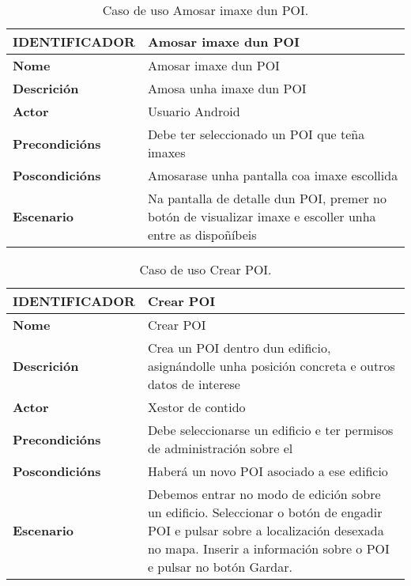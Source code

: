 \begin{table}[tbh]
	\footnotesize
	\centering
	\begin{tabular}{|l|p{10cm}|}
		\hline 
		\textbf{IDENTIFICADOR}	& \textbf{Amosar imaxe dun POI} \\ 
		\hline 
		\textbf{Nome} & Amosar imaxe dun POI \\ 
		\hline 
		\textbf{Descrición} & Amosa unha imaxe dun POI \\ 
		\hline 
		\textbf{Actor} & Usuario Android \\ 
		\hline 
		\textbf{Precondicións} & Debe ter seleccionado un POI que teña imaxes \\ 
		\hline 
		\textbf{Poscondicións} & Amosarase unha pantalla coa imaxe escollida \\ 
		\hline 
		\textbf{Escenario} & Na pantalla de detalle dun POI, premer no botón de visualizar imaxe e escoller unha entre as dispoñíbeis \\ 
		\hline 
	\end{tabular}
	\caption{Caso de uso Amosar imaxe dun POI.}
	\label{tab:cuAmosarImaxePOI}
\end{table}

\begin{table}[tbh]
	\footnotesize
	\centering
	\begin{tabular}{|l|p{10cm}|}
		\hline 
		\textbf{IDENTIFICADOR}	& \textbf{Crear POI} \\ 
		\hline 
		\textbf{Nome} & Crear POI \\ 
		\hline 
		\textbf{Descrición} & Crea un POI dentro dun edificio, asignándolle unha posición concreta e outros datos de interese \\ 
		\hline 
		\textbf{Actor} & Xestor de contido \\ 
		\hline 
		\textbf{Precondicións} & Debe seleccionarse un edificio e ter permisos de administración sobre el \\ 
		\hline 
		\textbf{Poscondicións} & Haberá un novo POI asociado a ese edificio \\ 
		\hline 
		\textbf{Escenario} & Debemos entrar no modo de edición sobre un edificio. Seleccionar o botón de engadir POI e pulsar sobre a localización desexada no mapa. Inserir a información sobre o POI e pulsar no botón Gardar. \\ 
		\hline 
	\end{tabular}
	\caption{Caso de uso Crear POI.}
	\label{tab:cuCrearPOI}
\end{table}

